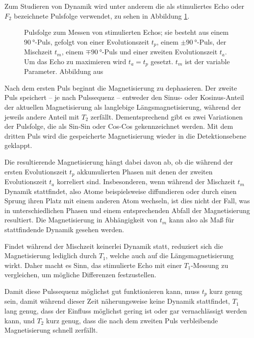 Zum Studieren von Dynamik wird unter anderem die als stimuliertes Echo oder $F_2$ bezeichnete Pulsfolge verwendet, zu sehen in Abbildung \ref{fig:theo:pulsF2}.
\begin{figure}
	\begin{center}
		
	\end{center}
	\caption{Pulsfolge zum Messen von stimulierten Echos; sie besteht aus einem $\SI{90}{\degree}$-Puls, gefolgt von einer Evolutionszeit $t_p$, einem $\pm \SI{90}{\degree}$-Puls, der Mischzeit $t_m$, einem $\mp \SI{90}{\degree}$-Puls und einer zweiten Evolutionszeit $t_a$. Um das Echo zu maximieren wird $t_a = t_p$ gesetzt. $t_m$ ist der variable Parameter. Abbildung aus \cite{joachim_master}}\label{fig:theo:pulsF2}
\end{figure}

Nach dem ersten Puls beginnt die Magnetisierung zu dephasieren. Der zweite Puls speichert -- je nach Pulssequenz -- entweder den Sinus- oder Kosinus-Anteil der aktuellen Magnetisierung als langlebige Längsmagnetisierung, während der jeweils andere Anteil mit $T_2$ zerfällt. Dementsprechend gibt es zwei Variationen der Pulsfolge, die als Sin-Sin oder Cos-Cos gekennzeichnet werden. Mit dem dritten Puls wird die gespeicherte Magnetisierung wieder in die Detektionsebene geklappt. 

Die resultierende Magnetisierung hängt dabei davon ab, ob die während der ersten Evolutionszeit $t_p$ akkumulierten Phasen mit denen der zweiten Evolutionszeit $t_a$ korreliert sind. Insbesonderen, wenn während der Mischzeit $t_m$ Dynamik stattfindet, also Atome beispielsweise diffundieren oder durch einen Sprung ihren Platz mit einem anderen Atom wechseln, ist dies nicht der Fall, was in unterschiedlichen Phasen und einem entsprechenden Abfall der Magnetisierung resultiert. Die Magnetisierung in Abhängigkeit von $t_m$ kann also als Maß für stattfindende Dynamik gesehen werden.

Findet während der Mischzeit keinerlei Dynamik statt, reduziert sich die Magnetisierung lediglich durch $T_1$, welche auch auf die Längsmagnetisierung wirkt. Daher macht es Sinn, das stimulierte Echo mit einer $T_1$-Messung zu vergleichen, um mögliche Differenzen festzustellen.

Damit diese Pulssequenz möglichst gut funktionieren kann, muss $t_p$ kurz genug sein, damit während dieser Zeit näherungsweise keine Dynamik stattfindet, $T_1$ lang genug, dass der Einfluss möglichst gering ist oder gar vernachlässigt werden kann, und $T_2$ kurz genug, dass die nach dem zweiten Puls verbleibende Magnetisierung schnell zerfällt.

